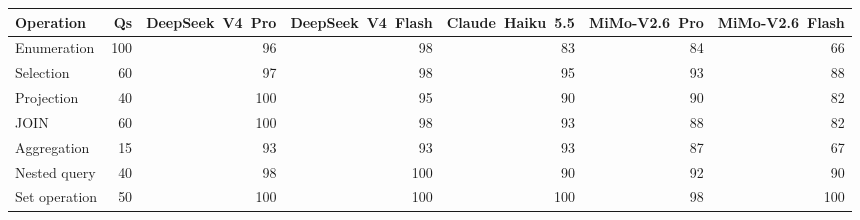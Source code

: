 \begin{tabular}{lrrrrrr}
\toprule
Operation & Qs & DeepSeek\ V4\ Pro & DeepSeek\ V4\ Flash & Claude\ Haiku\ 5.5 & MiMo-V2.6\ Pro & MiMo-V2.6\ Flash \\
\midrule
Enumeration & 100 & 96 & 98 & 83 & 84 & 66 \\
Selection & 60 & 97 & 98 & 95 & 93 & 88 \\
Projection & 40 & 100 & 95 & 90 & 90 & 82 \\
JOIN & 60 & 100 & 98 & 93 & 88 & 82 \\
Aggregation & 15 & 93 & 93 & 93 & 87 & 67 \\
Nested query & 40 & 98 & 100 & 90 & 92 & 90 \\
Set operation & 50 & 100 & 100 & 100 & 98 & 100 \\
\bottomrule
\end{tabular}
